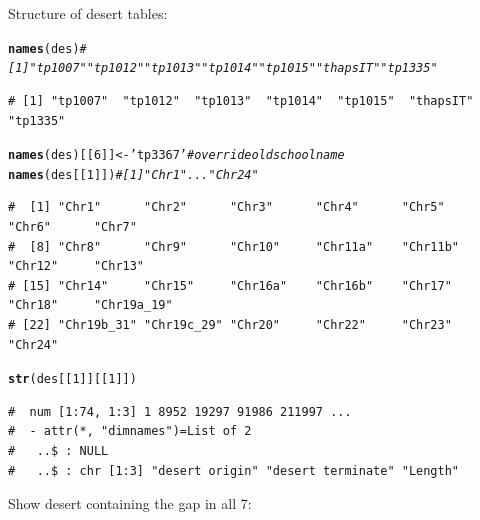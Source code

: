 \documentclass{article}\usepackage[]{graphicx}\usepackage[]{color}
\makeatletter
\newcommand{\hlnum}[1]{\textcolor[rgb]{0.686,0.059,0.569}{#1}}%
\newcommand{\hlstr}[1]{\textcolor[rgb]{0.192,0.494,0.8}{#1}}%
\newcommand{\hlcom}[1]{\textcolor[rgb]{0.678,0.584,0.686}{\textit{#1}}}%
\newcommand{\hlstd}[1]{\textcolor[rgb]{0.345,0.345,0.345}{#1}}%
\newcommand{\hlkwb}[1]{\textcolor[rgb]{0.69,0.353,0.396}{#1}}%
\newcommand{\hlkwd}[1]{\textcolor[rgb]{0.737,0.353,0.396}{\textbf{#1}}}%
\newenvironment{kframe}{%
 \def\at@end@of@kframe{}%
 \ifinner\ifhmode%
  \def\at@end@of@kframe{\end{minipage}}%
  \begin{minipage}{\columnwidth}%
 \fi\fi%
 \def\FrameCommand##1{\hskip\@totalleftmargin \hskip-\fboxsep
 \colorbox{shadecolor}{##1}\hskip-\fboxsep
     \hskip-\linewidth \hskip-\@totalleftmargin \hskip\columnwidth}%
 \MakeFramed {\advance\hsize-\width
   \@totalleftmargin\z@ \linewidth\hsize
   \@setminipage}}%
 {\par\unskip\endMakeFramed%
 \at@end@of@kframe}
\newenvironment{knitrout}{}{} %
\makeatother
\begin{document}
Structure of desert tables:
\begin{knitrout}\footnotesize
{}\color{fgcolor}\begin{kframe}
\begin{alltt}
\hlkwd{names}\hlstd{(des)}         \hlcom{# [1] "tp1007"  "tp1012"  "tp1013"  "tp1014"  "tp1015"  "thapsIT" "tp1335" }
\end{alltt}
\begin{verbatim}
# [1] "tp1007"  "tp1012"  "tp1013"  "tp1014"  "tp1015"  "thapsIT" "tp1335"
\end{verbatim}
\begin{alltt}
\hlkwd{names}\hlstd{(des)[[}\hlnum{6}\hlstd{]]} \hlkwb{<-} \hlstr{'tp3367'}  \hlcom{# override oldschool name}
\hlkwd{names}\hlstd{(des[[}\hlnum{1}\hlstd{]])}    \hlcom{# [1] "Chr1"   ...   "Chr24"}
\end{alltt}
\begin{verbatim}
#  [1] "Chr1"      "Chr2"      "Chr3"      "Chr4"      "Chr5"      "Chr6"      "Chr7"     
#  [8] "Chr8"      "Chr9"      "Chr10"     "Chr11a"    "Chr11b"    "Chr12"     "Chr13"    
# [15] "Chr14"     "Chr15"     "Chr16a"    "Chr16b"    "Chr17"     "Chr18"     "Chr19a_19"
# [22] "Chr19b_31" "Chr19c_29" "Chr20"     "Chr22"     "Chr23"     "Chr24"
\end{verbatim}
\begin{alltt}
\hlkwd{str}\hlstd{(des[[}\hlnum{1}\hlstd{]][[}\hlnum{1}\hlstd{]])}
\end{alltt}
\begin{verbatim}
#  num [1:74, 1:3] 1 8952 19297 91986 211997 ...
#  - attr(*, "dimnames")=List of 2
#   ..$ : NULL
#   ..$ : chr [1:3] "desert origin" "desert terminate" "Length"
\end{verbatim}
\end{kframe}
\end{knitrout}

Show desert containing the gap in all 7:
\end{document}
